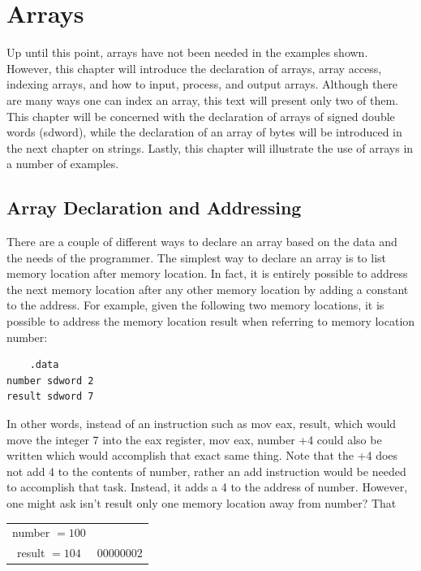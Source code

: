 \documentclass[10pt]{book}
\begin{document}
\section{Arrays}
Up until this point, arrays have not been needed in the examples shown. However, this chapter will introduce the declaration of arrays, array access, indexing arrays, and how to input, process, and output arrays. Although there are many ways one can index an array, this text will present only two of them. This chapter will be concerned with the declaration of arrays of signed double words (sdword), while the declaration of an array of bytes will be introduced in the next chapter on strings. Lastly, this chapter will illustrate the use of arrays in a number of examples.

\subsection{Array Declaration and Addressing}
There are a couple of different ways to declare an array based on the data and the needs of the programmer. The simplest way to declare an array is to list memory location after memory location. In fact, it is entirely possible to address the next memory location after any other memory location by adding a constant to the address. For example, given the following two memory locations, it is possible to address the memory location result when referring to memory location number:

\begin{verbatim}
    .data
number sdword 2
result sdword 7
\end{verbatim}

In other words, instead of an instruction such as mov eax, result, which would move the integer 7 into the eax register, mov eax, number +4 could also be written which would accomplish that exact same thing. Note that the +4 does not add 4 to the contents of number, rather an add instruction would be needed to accomplish that task. Instead, it adds a 4 to the address of number. However, one might ask isn't result only one memory location away from number? That

\begin{center}
\begin{tabular}{c|c|}
number $=100$ &  \\
result $=104$ & 00000002 \\
\hline
\end{tabular}
\end{center}
\end{document}
